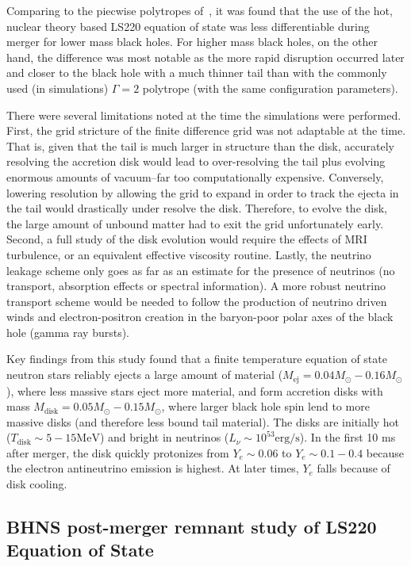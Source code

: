 Comparing to the piecwise polytropes of~\cite{hebeler2013equation}, it was found that the use of the hot, nuclear theory based LS220 equation of state was less differentiable during merger for lower mass black holes.  
For higher mass black holes, on the other hand, the difference was most notable as the more rapid disruption occurred later and closer to the black hole with a much thinner tail than with the commonly used (in simulations) $\Gamma = 2$ polytrope (with the same configuration parameters).

There were several limitations noted at the time the simulations were performed.
First, the grid stricture of the finite difference grid was not adaptable at the time.  
That is, given that the tail is much larger in structure than the disk, accurately resolving the accretion disk would lead to over-resolving the tail plus evolving enormous amounts of vacuum--far too computationally expensive.
Conversely, lowering resolution by allowing the grid to expand in order to track the ejecta in the tail would drastically under resolve the disk.  
Therefore, to evolve the disk, the large amount of unbound matter had to exit the grid unfortunately early.  Second, a full study of the disk evolution would require the effects of MRI turbulence, or an equivalent effective viscosity routine.
Lastly, the neutrino leakage scheme only goes as far as an estimate for the presence of neutrinos (no transport, absorption effects or spectral information).
A more robust neutrino transport scheme would be needed to follow the production of neutrino driven winds and electron-positron creation in the baryon-poor polar axes of the black hole (gamma ray bursts).

Key findings from this study found that a finite temperature equation of state neutron stars reliably ejects a large amount of material ($M_\textrm{ej} = 0.04 M_\odot -  0.16 M_\odot$), where less massive stars eject more material, and form accretion disks with mass $M_\textrm{disk} = 0.05 M_\odot -  0.15 M_\odot$, where larger black hole spin lend to more massive disks (and therefore less bound tail material).  The disks are initially hot ($T_\textrm{disk} \sim 5-15 \textrm{MeV}$) and bright in neutrinos ($L_\nu \sim 10^{53} \textrm{erg/s}$).  In the first 10 ms after merger, the disk quickly protonizes from $Y_e \sim 0.06$ to $Y_e \sim 0.1 - 0.4$ because the electron antineutrino emission is highest.  
At later times, $Y_e$ falls because of disk cooling.

\subsection{BHNS post-merger remnant study of LS220 Equation of State}

